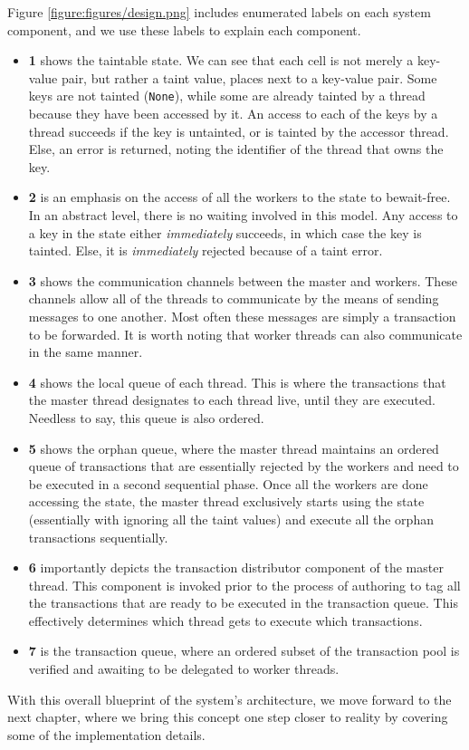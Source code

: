 
Figure \ref{figure:figures/design.png} includes enumerated labels on each system component, and we
use these labels to explain each component.

\begin{itemize}
	\item \textbf{1} shows the taintable state. We can see that each cell is not merely a key-value
	pair, but rather a taint value, places next to a key-value pair. Some keys are not tainted
	(\texttt{None}), while some are already tainted by a thread because they have been accessed by
	it. An access to each of the keys by a thread succeeds if the key is untainted, or is
	tainted by the accessor thread. Else, an error is returned, noting the identifier of the thread
	that owns the key.
	\item \textbf{2} is an emphasis on the access of all the workers to the state to bewait-free. In an abstract
	level, there is no waiting involved in this model. Any access to a key in the state either
	\textit{immediately} succeeds, in which case the key is tainted. Else, it is
	\textit{immediately} rejected because of a taint error.
	\item \textbf{3} shows the communication channels between the master and workers. These channels
	allow all of the threads to communicate by the means of sending messages to one another. Most
	often these messages are simply a transaction to be forwarded. It is worth noting that worker
	threads can also communicate in the same manner.
	\item \textbf{4} shows the local queue of each thread. This is where the transactions that the
	master thread designates to each thread live, until they are executed. Needless to say, this
	queue is also ordered.
	\item \textbf{5} shows the orphan queue, where the master thread maintains an ordered queue of
	transactions that are essentially rejected by the workers and need to be executed in a second
	sequential phase. Once all the workers are done accessing the state, the master thread
	exclusively starts using the state (essentially with ignoring all the taint values) and execute
	all the orphan transactions sequentially.
	\item \textbf{6} importantly depicts the transaction distributor component of the master thread.
	This component is invoked prior to the process of authoring to tag all the transactions that are
	ready to be executed in the transaction queue. This effectively determines which thread gets to
	execute which transactions.
	\item \textbf{7} is the transaction queue, where an ordered subset of the transaction pool is
	verified and awaiting to be delegated to worker threads.
\end{itemize}

With this overall blueprint of the system's architecture, we move forward to the next chapter, where
we bring this concept one step closer to reality by covering some of the implementation
details.






